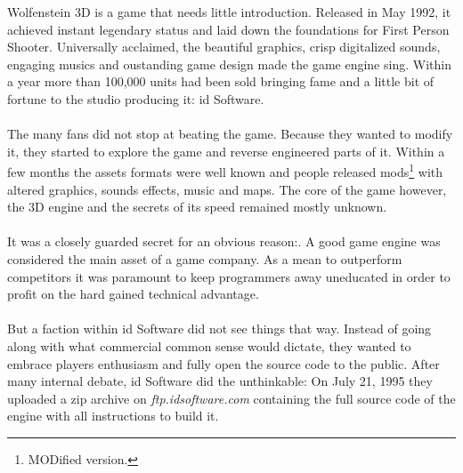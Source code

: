 Wolfenstein 3D is a game that needs little introduction. Released in May 1992, it achieved instant legendary status and laid down the foundations for First Person Shooter. Universally acclaimed, the beautiful graphics, crisp digitalized sounds, engaging musics and oustanding game design made the game engine sing. Within a year more than 100,000 units had been sold bringing fame and a little bit of fortune to the studio producing it: id Software.\\
\\
The many fans did not stop at beating the game. Because they wanted to modify it, they started to explore the game and reverse engineered parts of it. Within a few months the assets formats were well known and people released mods\footnote{MODified version.} with altered graphics, sounds effects, music and maps. The core of the game however, the 3D engine and the secrets of its speed remained mostly unknown.\\
\\
It was a closely guarded secret for an obvious reason:. A good game engine was considered the main asset of a game company. As a mean to outperform competitors it was paramount to keep programmers away uneducated in order to profit on the hard gained technical advantage.\\
\\
But a faction within id Software did not see things that way. Instead of going along with what commercial common sense would dictate, they wanted to embrace players enthusiasm and fully open the source code to the public. After many internal debate, id Software did the unthinkable: On July 21, 1995 they uploaded a zip archive on \emph{ftp.idsoftware.com} containing the full source code of the engine with all instructions to build it.\\

